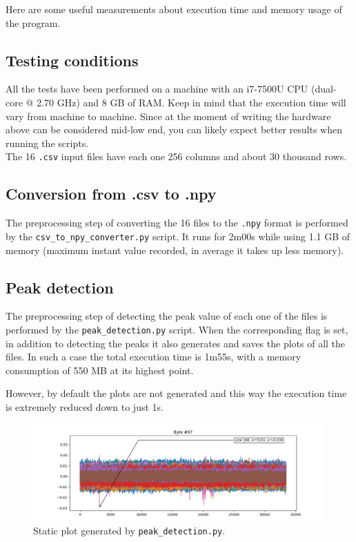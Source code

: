 \documentclass[11pt,a4paper]{article}
\begin{document}
Here are some useful measurements about execution time and memory usage of the program.

\subsection{Testing conditions}

All the tests have been performed on a machine with an i7-7500U CPU (dual-core @ 2.70 GHz) and 8 GB of RAM.
Keep in mind that the execution time will vary from machine to machine.
Since at the moment of writing the hardware above can be considered mid-low end, you can likely expect better results when running the scripts.\\

The 16 \texttt{.csv} input files have each one 256 columns and about 30 thousand rows.

\subsection{Conversion from .csv to .npy}

The preprocessing step of converting the 16 files to the \texttt{.npy} format is performed by the \texttt{csv\_to\_npy\_converter.py} script.
It runs for 2m00s while using 1.1 GB of memory (maximum instant value recorded, in average it takes up less memory).

\subsection{Peak detection}

The preprocessing step of detecting the peak value of each one of the files is performed by the \texttt{peak\_detection.py} script.
When the corresponding flag is set, in addition to detecting the peaks it also generates and saves the plots of all the files.
In such a case the total execution time is 1m55s, with a memory consumption of 550 MB at its highest point.

However, by default the plots are not generated and this way the execution time is extremely reduced down to just 1s.

\begin{figure}[H]
    \centering
    \includegraphics[scale=0.6]{static_plot.png}
    \caption{Static plot generated by \texttt{peak\_detection.py}.}
    \label{fig:static_plot}
\end{figure}
\end{document}
